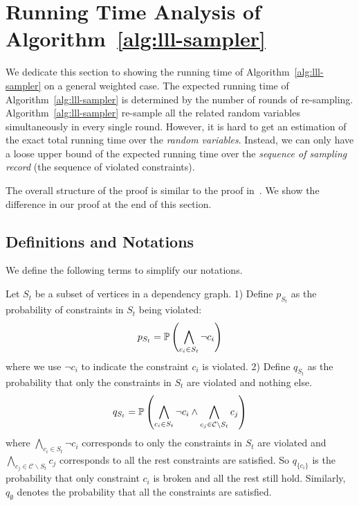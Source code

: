 
\section{Running Time Analysis of Algorithm~\ref{alg:lll-sampler}} \label{appendix:time-analysis}
We dedicate this section to showing the running time of Algorithm~\ref{alg:lll-sampler} on a general weighted case.
%
The expected running time of Algorithm~\ref{alg:lll-sampler} is determined by the number of rounds of re-sampling.  
%
Algorithm~\ref{alg:lll-sampler} re-sample all the related random variables simultaneously in every single round.
%
However, it is hard to get an estimation of the exact total running time over the \textit{random variables}. Instead, we can only have a loose upper bound of the expected running time over the \textit{sequence of sampling record} (the sequence of violated constraints).


The overall structure of the proof is similar to the proof in~\citet[Theorem 13]{DBLP:journals/jacm/GuoJL19}. We show the difference in our proof at the end of this section.

\subsection{Definitions and Notations}
We define the following terms to simplify our notations.
\begin{definition}  \label{def:p_q_st}
Let $S_t$ be a subset of vertices in a dependency graph.
1) Define $p_{S_t}$ as the probability of  constraints in $S_t$ being violated:
\begin{equation} \label{eq:def-pst}
p_{S_t}=\mathbb{P}\left(\bigwedge_{c_i \in S_t}\neg{c}_i \right)
\end{equation}
{where we use $\neg{c}_i $ to indicate the constraint $c_i$ is violated.}
2) Define $q_{S_t}$ as the probability that only the constraints in $S_t$ are violated and nothing else. 
\begin{equation} \label{eq:definition-qst}
q_{S_t}=\mathbb{P}\left(\bigwedge_{c_i \in S_t}\neg{c}_i \wedge \bigwedge_{c_j \in \mathcal{C}\backslash S_t}c_j\right)
\end{equation}
{where $\bigwedge_{c_i \in S_t}\neg{c}_i $ corresponds to only the constraints in $S_t$ are violated and $\bigwedge_{c_j \in \mathcal{C}\backslash S_t}c_j$ corresponds to all the rest constraints are satisfied.}
So $q_{\{c_i\}}$ is the probability that only constraint $c_i$ is broken and all the rest still  hold. Similarly, $q_{\emptyset}$ denotes the probability that all the constraints are satisfied.
\end{definition}



